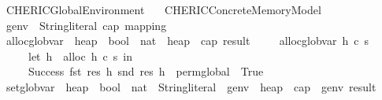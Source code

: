 %
\begin{isabellebody}%
%
%
\isadelimtheory
%
\endisadelimtheory
%
\isatagtheory
{}\isamarkupfalse%
\ CHERI{\isacharunderscore}{\kern0pt}C{\isacharunderscore}{\kern0pt}Global{\isacharunderscore}{\kern0pt}Environment\isanewline
\ \ \ CHERI{\isacharunderscore}{\kern0pt}C{\isacharunderscore}{\kern0pt}Concrete{\isacharunderscore}{\kern0pt}Memory{\isacharunderscore}{\kern0pt}Model\isanewline
{}%
\endisatagtheory
{\isafoldtheory}%
%
\isadelimtheory
\isanewline
%
\endisadelimtheory
\isanewline
\isanewline
\isanewline
{}\isamarkupfalse%
\ genv\ {\isacharequal}{\kern0pt}\ {\isachardoublequoteopen}{\isacharparenleft}{\kern0pt}String{\isachardot}{\kern0pt}literal{\isacharcomma}{\kern0pt}\ cap{\isacharparenright}{\kern0pt}\ mapping{\isachardoublequoteclose}\isanewline
\isanewline
{}\isamarkupfalse%
\ alloc{\isacharunderscore}{\kern0pt}glob{\isacharunderscore}{\kern0pt}var\ {\isacharcolon}{\kern0pt}{\isacharcolon}{\kern0pt}\ {\isachardoublequoteopen}heap\ {\isasymRightarrow}\ bool\ {\isasymRightarrow}\ nat\ {\isasymRightarrow}\ {\isacharparenleft}{\kern0pt}heap\ {\isasymtimes}\ cap{\isacharparenright}{\kern0pt}\ result{\isachardoublequoteclose}\isanewline
\ \ \isanewline
\ \ {\isachardoublequoteopen}alloc{\isacharunderscore}{\kern0pt}glob{\isacharunderscore}{\kern0pt}var\ h\ c\ s\ {\isasymequiv}\ \isanewline
\ \ \ \ \ let\ h{\isacharprime}{\kern0pt}\ {\isacharequal}{\kern0pt}\ alloc\ h\ c\ s\ in\isanewline
\ \ \ \ \ Success\ {\isacharparenleft}{\kern0pt}fst\ {\isacharparenleft}{\kern0pt}res\ h{\isacharprime}{\kern0pt}{\isacharparenright}{\kern0pt}{\isacharcomma}{\kern0pt}\ snd\ {\isacharparenleft}{\kern0pt}res\ h{\isacharprime}{\kern0pt}{\isacharparenright}{\kern0pt}\ {\isasymlparr}\ perm{\isacharunderscore}{\kern0pt}global\ {\isacharcolon}{\kern0pt}{\isacharequal}{\kern0pt}\ True\ {\isasymrparr}{\isacharparenright}{\kern0pt}{\isachardoublequoteclose}\isanewline
\isanewline
{}\isamarkupfalse%
\ set{\isacharunderscore}{\kern0pt}glob{\isacharunderscore}{\kern0pt}var\ {\isacharcolon}{\kern0pt}{\isacharcolon}{\kern0pt}\ {\isachardoublequoteopen}heap\ {\isasymRightarrow}\ bool\ {\isasymRightarrow}\ nat\ {\isasymRightarrow}\ String{\isachardot}{\kern0pt}literal\ {\isasymRightarrow}\ genv\ {\isasymRightarrow}\ {\isacharparenleft}{\kern0pt}heap\ {\isasymtimes}\ cap\ {\isasymtimes}\ genv{\isacharparenright}{\kern0pt}\ result{\isachardoublequoteclose}\isanewline

\end{isabellebody}
